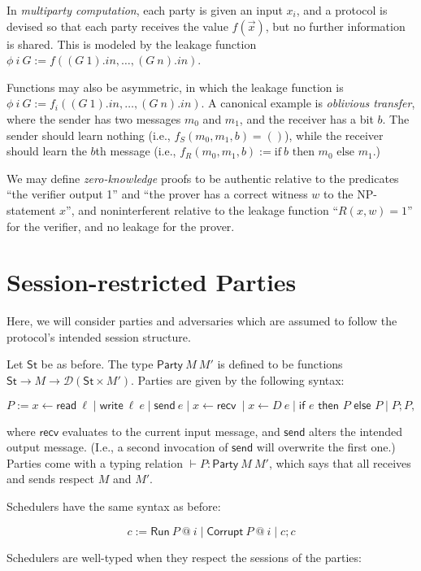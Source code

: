 \documentclass{article}
\newcommand{\St}{\mathsf{St}}
\newcommand{\D}{\mathcal{D}}
\newcommand{\Read}{\mathsf{read}}
\newcommand{\Write}{\mathsf{write}}
\newcommand{\send}{\mathsf{send}}
\newcommand{\recv}{\mathsf{recv}}
\begin{document}
In \emph{multiparty computation}, each party is given an input $x_i$, and a protocol is devised so that each party receives the value $f(\vec{x})$, but no further information is shared. This is modeled by the leakage function $\phi\ i\ G := f((G\ 1).in, \dots, (G\ n).in)$.

Functions may also be asymmetric, in which the leakage function is $\phi\ i\ G := f_i((G\ 1).in, \dots, (G\ n).in)$. A canonical example is \emph{oblivious transfer}, where the sender has two messages $m_0$ and $m_1$, and the receiver has a bit $b$. The sender should learn nothing (i.e., $f_S (m_0, m_1, b) = ()$), while the receiver should learn the $b$th message (i.e., $f_R (m_0, m_1, b) := \text{if}\ b \text{ then } m_0 \text{ else } m_1.$)


We may define \emph{zero-knowledge} proofs to be authentic relative to the predicates ``the verifier output 1'' and ``the prover has a correct witness $w$ to the NP-statement $x$'', and noninterferent relative to the leakage function ``$R(x,w) = 1$'' for the verifier, and no leakage for the prover. 


\section{Session-restricted Parties}

Here, we will consider parties and adversaries which are assumed to follow the protocol's intended session structure. 

Let $\St$ be as before. The type $\mathsf{Party}\ M\ M'$ is defined to be functions $\St \to M \to \D(\St \times M')$. Parties are given by the following syntax:

\[ P := x \leftarrow \Read\ \ell \mid \Write\ \ell\ e \mid \send\ e \mid x \leftarrow \recv\ \mid x \leftarrow D\ e \mid \textsf{if } e \textsf{ then } P \textsf{ else } P \mid P; P, \]

where $\recv$ evaluates to the current input message, and $\send$ alters the intended output message. (I.e., a second invocation of $\send$ will overwrite the first one.) Parties come with a typing relation $\vdash P : \mathsf{Party}\ M\ M'$, which says that all receives and sends respect $M$ and $M'$.


Schedulers have the same syntax as before:

\[ c := \textsf{Run}\ P\ @\ i \mid \textsf{Corrupt}\ P\ @\ i \mid c; c\]

Schedulers are well-typed when they respect the sessions of the parties:
\end{document}
